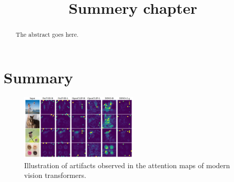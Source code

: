 \documentclass[conference]{IEEEtran}
\begin{document}
\title{ Summery chapter}



\author{
	}



\maketitle

\begin{abstract}
The abstract goes here.
\end{abstract}



\IEEEpeerreviewmaketitle



\section{Summary}

\begin{figure}
    \centering
    \includegraphics[width=0.5\textwidth]{vits-artifacts.png}
    \caption{Illustration of artifacts observed in the attention maps of modern vision transformers. \cite{registers}}
    \label{fig:artifacts-observations}
\end{figure}
\end{document}
